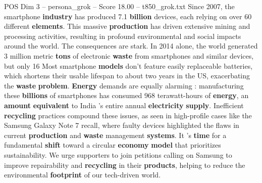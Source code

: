 \begin{textsample}{POS Dim 3 – persona\_grok – Score 18.00 – t850\_grok.txt}  \label{ex:f3_pos_033}
Since 2007, the smartphone \textbf{industry} has produced 7.1 \textbf{billion} devices, each relying on over 60 different \textbf{elements}.
This massive \textbf{production} has driven extensive mining and processing activities, resulting in profound environmental and social impacts around the world.
The consequences are stark.
In 2014 alone, the world generated 3 million metric \textbf{tons} of electronic \textbf{waste} from smartphones and similar devices, but only 16 %
Most smartphone \textbf{models} don't feature easily replaceable batteries, which shortens their usable lifespan to about two years in the US, exacerbating the \textbf{waste} \textbf{problem}. \textbf{Energy} demands are equally alarming : manufacturing these \textbf{billions} of smartphones has consumed 968 terawatt-hours of \textbf{energy}, an \textbf{amount} \textbf{equivalent} to India 's entire annual \textbf{electricity} \textbf{supply}.
Inefficient \textbf{recycling} practices compound these issues, as seen in high-profile cases like the Samsung Galaxy Note 7 recall, where faulty devices highlighted the flaws in current \textbf{production} and \textbf{waste} management \textbf{systems}.
It 's \textbf{time} for a fundamental \textbf{shift} toward a circular \textbf{economy} \textbf{model} that prioritizes sustainability.
We urge supporters to join petitions calling on Samsung to improve repairability and \textbf{recycling} in their \textbf{products}, helping to reduce the environmental \textbf{footprint} of our tech-driven world.

\end{textsample}
